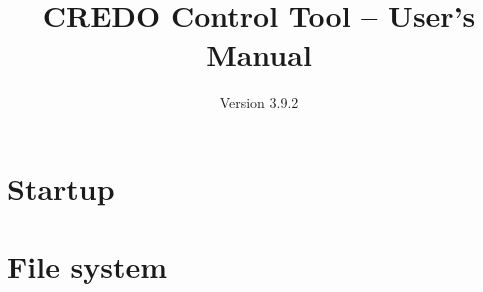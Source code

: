 \documentclass[a4paper]{article}
\begin{document}
\title{CREDO Control Tool -- User's Manual}
\date{Version 3.9.2}
\author{}

\maketitle

\section{Startup}



\section{File system}
\end{document}
